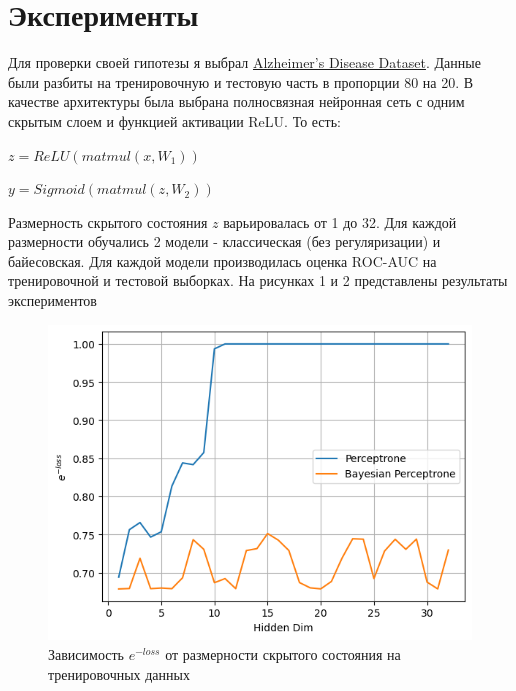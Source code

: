\documentclass{article}
\begin{document}
\section{Эксперименты}

Для проверки своей гипотезы я выбрал \href{https://www.kaggle.com/datasets/rabieelkharoua/alzheimers-disease-dataset}{Alzheimer's Disease Dataset}. Данные были разбиты на тренировочную и тестовую часть в пропорции 80 на 20. В качестве архитектуры была выбрана полносвязная нейронная сеть с одним скрытым слоем и функцией активации ReLU. То есть:

$z = ReLU(matmul(x, W_1))$

$y = Sigmoid(matmul(z, W_2))$

Размерность скрытого состояния $z$ варьировалась от 1 до 32. Для каждой размерности обучались 2 модели - классическая (без регуляризации) и байесовская. Для каждой модели производилась оценка ROC-AUC на тренировочной и тестовой выборках. На рисунках 1 и 2 представлены результаты экспериментов

\begin{figure}
    \centering
    \includegraphics[width=1\linewidth]{loss.png}
    \caption{Зависимость $e^{-loss}$ от размерности скрытого состояния на тренировочных данных}
    \label{fig:enter-label}
\end{figure}
\end{document}
